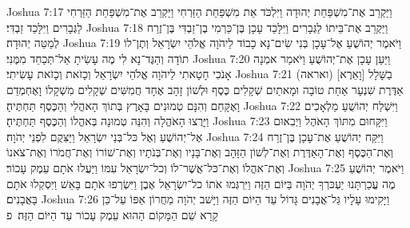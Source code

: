 Joshua 7:17	וַיַּקְרֵב אֶת־מִשְׁפַּחַת יְהוּדָה וַיִּלְכֹּד אֵת מִשְׁפַּחַת הַזַּרְחִי וַיַּקְרֵב אֶת־מִשְׁפַּחַת הַזַּרְחִי לַגְּבָרִים וַיִּלָּכֵד זַבְדִּי׃
Joshua 7:18	וַיַּקְרֵב אֶת־בֵּיתוֹ לַגְּבָרִים וַיִּלָּכֵד עָכָן בֶּן־כַּרְמִי בֶן־זַבְדִּי בֶּן־זֶרַח לְמַטֵּה יְהוּדָה׃
Joshua 7:19	וַיֹּאמֶר יְהוֹשֻׁעַ אֶל־עָכָן בְּנִי שִׂים־נָא כָבוֹד לַיהֹוָה אֱלֹהֵי יִשְׂרָאֵל וְתֶן־לוֹ תוֹדָה וְהַגֶּד־נָא לִי מֶה עָשִׂיתָ אַל־תְּכַחֵד מִמֶּנִּי׃
Joshua 7:20	וַיַּעַן עָכָן אֶת־יְהוֹשֻׁעַ וַיֹּאמַר אמְנָה אָנֹכִי חָטָאתִי לַיהֹוָה אֱלֹהֵי יִשְׂרָאֵל וְכָזֹאת וְכָזֹאת עָשִׂיתִי׃
Joshua 7:21	(ואראה) [וָאֵרֶא] בַשָּׁלָל אַדֶּרֶת שִׁנְעָר אַחַת טוֹבָה וּמָאתַיִם שְׁקָלִים כֶּסֶף וּלְשׁוֹן זָהָב אֶחָד חֲמִשִּׁים שְׁקָלִים מִשְׁקָלוֹ וָאֶחְמְדֵם וָאֶקָּחֵם וְהִנָּם טְמוּנִים בָּאָרֶץ בְּתוֹךְ הָאהֳלִי וְהַכֶּסֶף תַּחְתֶּיהָ׃
Joshua 7:22	וַיִּשְׁלַח יְהוֹשֻׁעַ מַלְאָכִים וַיָּרֻצוּ הָאֹהֱלָה וְהִנֵּה טְמוּנָה בְּאהֳלוֹ וְהַכֶּסֶף תַּחְתֶּיהָ׃
Joshua 7:23	וַיִּקָּחוּם מִתּוֹךְ הָאֹהֶל וַיְבִאוּם אֶל־יְהוֹשֻׁעַ וְאֶל כּל־בְּנֵי יִשְׂרָאֵל וַיַּצִּקֻם לִפְנֵי יְהֹוָה׃
Joshua 7:24	וַיִּקַּח יְהוֹשֻׁעַ אֶת־עָכָן בֶּן־זֶרַח וְאֶת־הַכֶּסֶף וְאֶת־הָאַדֶּרֶת וְאֶת־לְשׁוֹן הַזָּהָב וְאֶת־בָּנָיו וְאֶת־בְּנֹתָיו וְאֶת־שׁוֹרוֹ וְאֶת־חֲמֹרוֹ וְאֶת־צֹאנוֹ וְאֶת־אהֳלוֹ וְאֶת־כּל־אֲשֶׁר־לוֹ וְכל־יִשְׂרָאֵל עִמּוֹ וַיַּעֲלוּ אֹתָם עֵמֶק עָכוֹר׃
Joshua 7:25	וַיֹּאמֶר יְהוֹשֻׁעַ מֶה עֲכַרְתָּנוּ יַעְכּרְךָ יְהֹוָה בַּיּוֹם הַזֶּה וַיִּרְגְּמוּ אֹתוֹ כל־יִשְׂרָאֵל אֶבֶן וַיִּשְׂרְפוּ אֹתָם בָּאֵשׁ וַיִּסְקְלוּ אֹתָם בָּאֲבָנִים׃
Joshua 7:26	וַיָּקִימוּ עָלָיו גַּל־אֲבָנִים גָּדוֹל עַד הַיּוֹם הַזֶּה וַיָּשׁב יְהֹוָה מֵחֲרוֹן אַפּוֹ עַל־כֵּן קָרָא שֵׁם הַמָּקוֹם הַהוּא עֵמֶק עָכוֹר עַד הַיּוֹם הַזֶּה׃ {פ}
